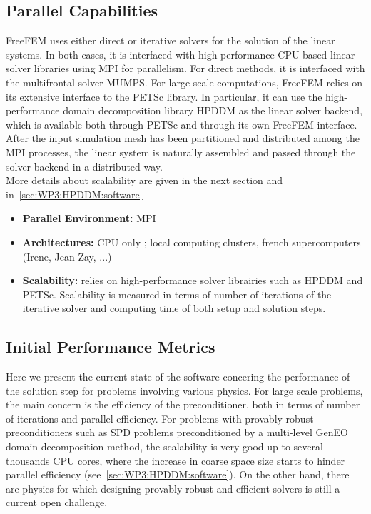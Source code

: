 \subsection{Parallel Capabilities}
\label{sec:WP3:Freefem++:performances}

FreeFEM uses either direct or iterative solvers for the solution of the linear systems. In both cases, it is interfaced with high-performance CPU-based linear solver libraries using MPI for parallelism. For direct methods, it is interfaced with the multifrontal solver MUMPS. For large scale computations, FreeFEM relies on its extensive interface to the PETSc library. In particular, it can use the high-performance domain decomposition library HPDDM as the linear solver backend, which is available both through PETSc and through its own FreeFEM interface. After the input simulation mesh has been partitioned and distributed among the MPI processes, the linear system is naturally assembled and passed through the solver backend in a distributed way.\\
More details about scalability are given in the next section and in~\cref{sec:WP3:HPDDM:software}

\begin{itemize}
    \item \textbf{Parallel Environment:} MPI

    \item \textbf{Architectures:} CPU only ; local computing clusters, french supercomputers (Irene, Jean Zay, ...)
 
    \item \textbf{Scalability:} relies on high-performance solver librairies such as HPDDM and PETSc. Scalability is measured in terms of number of iterations of the iterative solver and computing time of both setup and solution steps.
\end{itemize}

\subsection{Initial Performance Metrics}
\label{sec:WP3:Freefem++:metrics}

Here we present the current state of the software concering the performance of the solution step for problems involving various physics. For large scale problems, the main concern is the efficiency of the preconditioner, both in terms of number of iterations and parallel efficiency. For problems with provably robust preconditioners such as SPD problems preconditioned by a multi-level GenEO domain-decomposition method, the scalability is very good up to several thousands CPU cores, where the increase in coarse space size starts to hinder parallel efficiency (see~\cref{sec:WP3:HPDDM:software}). On the other hand, there are physics for which designing provably robust and efficient solvers is still a current open challenge.\\


